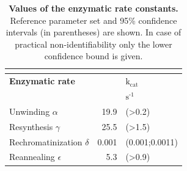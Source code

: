 \begin{table}[H]
	
\begin{center}
	\begin{tabular}{lrl}
		
		\multicolumn{3}{l}{} \\
		\hline
		\textbf{Enzymatic rate}    && \textbf{$\text{k}_{\text{cat}}$}  \\
		\hline
		&  &$\text{s}^{\text{-1}}$       \\
		Unwinding  $\alpha$                                     & 19.9& (>0.2)                 \\
		Resynthesis $\gamma$                                 & 25.5 &(>1.5)     \\
		Rechromatinization $\delta$                         & 0.001 &(0.001;0.0011)                   \\
		Reannealing  $\epsilon$                                & 5.3&(>0.9)    \\
		\hline
	\end{tabular}
	\caption{\textbf{Values of the enzymatic rate constants.}  Reference parameter set and 95\% confidence intervals (in parentheses) are shown. In case of practical non-identifiability only the lower confidence bound is given.}
	\label{tab:antibodies}
	\end{center}
\end{table}
